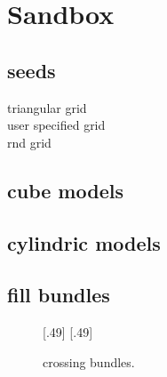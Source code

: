 \section{Sandbox}
% 
\subsection{seeds}
% 
triangular grid\\
user specified grid\\
\eg rnd grid\\
% 
\subsection{cube models}
% 
\subsection{cylindric models}
% 
\subsection{fill bundles}
% 
\begin{figure}[!t]
    \def\tikzheight{0.35\textwidth}
    \centering
    [.49\textwidth]{
    }
    [.49\textwidth]{
    }
	\caption{crossing bundles.}
\end{figure}
% 
